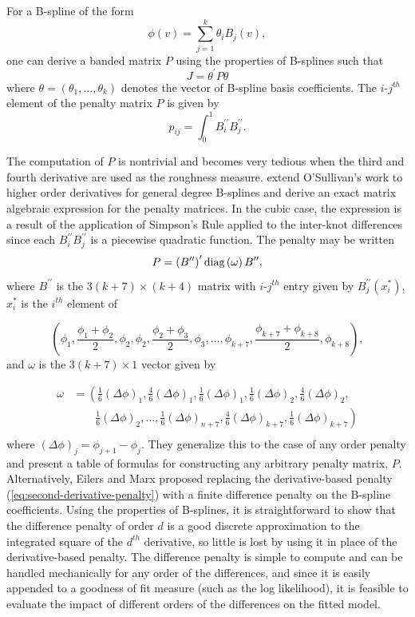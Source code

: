 For a B-spline of the form
\[
\phi\left(v\right) = \sum\limits_{j=1}^k \theta_i B_j\left(v\right),
\]
one can derive a banded matrix $P$ using the properties of B-splines such that 
 \[
 J = \theta^\prime P \theta
 \] 
 \noindent
 where $\theta = \left(\theta_1,\dots, \theta_k\right)$ denotes the vector of B-spline basis coefficients. The $i$-$j^{th}$ element of the penalty matrix $P$ is given by
 \[
 p_{ij} = \int_0^1 B_i^{\prime \prime} B_j^{\prime \prime}.
 \]

The computation of $P$ is nontrivial and becomes very tedious when the third and fourth derivative are used as the roughness measure. \cite{wand2008semiparametric} extend O'Sullivan's work to higher order derivatives for general degree B-splines and derive an exact matrix algebraic expression for the penalty matrices. In the cubic case, the expression is a result of the application of Simpson's Rule applied to the inter-knot differences since each $B_i^{\prime \prime} B_j^{\prime \prime}$ is a piecewise quadratic function. The penalty may be written
 \[
 P = \left(B^{\prime \prime}\right)^\prime \textup{diag}\left(\omega \right) B^{\prime \prime}, 
 \]
 \noindent
 where $B^{\prime \prime}$ is the $3\left( k + 7 \right) \times \left( k + 4 \right)$ matrix with $i$-$j^{th}$ entry given by $B_j^{\prime \prime} \left(x_i^*\right)$, $x^*_i$ is the $i^{th}$ element of 
 
\[
\left( \phi_1,\frac{\phi_1+\phi_2}{2},\phi_2,\phi_2,\frac{\phi_2+\phi_3}{2},\phi_3,\dots,\phi_{k+7},\frac{\phi_{k+7}+\phi_{k+8}}{2},\phi_{k+8} \right),
\]
 \noindent
 and $\omega$ is the $3\left(k+7\right) \times 1$ vector given by
 
\begin{align*}
\omega &= \left( \frac{1}{6}\left(\Delta \phi \right)_1,\frac{4}{6}\left(\Delta \phi \right)_1, \frac{1}{6}\left(\Delta \phi \right)_1,\frac{1}{6}\left(\Delta \phi \right)_2, \frac{4}{6}\left(\Delta \phi \right)_2,  \right. \\
&\qquad   \left. {} \frac{1}{6}\left(\Delta \phi \right)_2 , \dots , \frac{1}{6}\left(\Delta \phi \right)_{n+7}, \frac{4}{6}\left(\Delta \phi \right)_{k+7}, \frac{1}{6}\left(\Delta \phi \right)_{k+7}  \right) \\
\end{align*}
\noindent
 where $\left(\Delta \phi \right)_j = \phi_{j+1}-\phi_j$. They generalize this to the case of any order penalty and present a table of formulas for constructing any arbitrary penalty matrix, $P$.  Alternatively, Eilers and Marx proposed replacing the derivative-based penalty (\ref{eq:second-derivative-penalty}) with a finite difference penalty on the B-spline coefficients. Using the properties of B-splines, it is straightforward to show that the difference penalty of order $d$ is a good discrete approximation to the integrated square of the $d^{th}$ derivative, so little is lost by using it in place of the derivative-based penalty. The difference penalty is simple to compute and can be handled mechanically for any order of the differences, and since it is easily appended to a goodness of fit measure (such as the log likelihood), it is feasible to evaluate the impact of different orders of the differences on the fitted model.  


